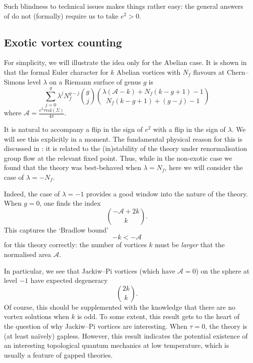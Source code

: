 \documentclass[10pt]{article}
\newcommand{\mc}[1]{\mathcal{#1}}
\theoremstyle{definition}
\begin{document}
Such blindness to technical issues makes things rather easy: the general answers of \cite{waltonVC} do not (formally) require us to take \(e^2 > 0\).



\subsection{Exotic vortex counting}

For simplicity, we will illustrate the idea only for the Abelian case. It is shown in \cite{waltonVC} that the formal Euler character for \(k\) Abelian vortices with \(N_f\) flavours at Chern--Simons level \(\lambda\) on a Riemann surface of genus \(g\) is
\[
\sum_{j=0}^g \lambda^j N_f^{g-j} {g \choose j} {\lambda(\mc{A} - k ) + N_f(k-g+1) -1 \choose N_f(k - g+1) + (g-j) - 1}
\] 
where \(\mc{A} = \frac{e^2 \tau \text{vol}(\Sigma)}{4\pi}\).

It is natural to accompany a flip in the sign of \(e^2\) with a flip in the sign of \(\lambda\). We will see this explicitly in a moment. The fundamental physical reason for this is discussed in \cite{turnerQO}: it is related to the (in)stability of the theory under renormalisation group flow at the relevant fixed point. Thus, while in the non-exotic case we found that the theory was best-behaved when \(\lambda = N_f\), here we will consider the case of \(\lambda = -N_f\).

Indeed, the case of \(\lambda = -1\) provides a good window into the nature of the theory. When \(g=0\), one finds the index
\[
{ -\mc{A}  + 2k \choose k } \text{.}
\]
This captures the `Bradlow bound'
\[
-k < -\mc{A}
\]
for this theory correctly: the number of vortices \(k\) must be \emph{larger} that the normalised area \(\mc{A}\).

In particular, we see that Jackiw--Pi vortices (which have \(\mc{A} = 0\)) on the sphere at level \(-1\) have expected degeneracy
\begin{equation}
\label{eq:JPcount1}
{2k \choose k} \text{.}
\end{equation}
Of course, this should be supplemented with the knowledge that there are no vortex solutions when \(k\) is odd.
To some extent, this result gets to the heart of the question of why Jackiw--Pi vortices are interesting. When \(\tau = 0\), the theory is (at least na\"ively) gapless. However, this result indicates the potential existence of an interesting topological quantum mechanics at low temperature, which is usually a feature of gapped theories. 
\end{document}
